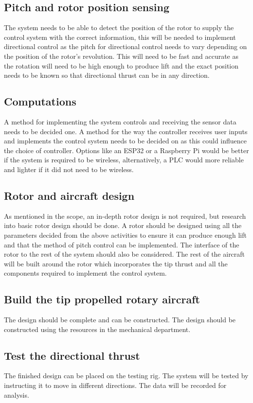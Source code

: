     \subsection{Pitch and rotor position sensing}
        The system needs to be able to detect the position of the rotor to supply the control system with the correct information, this will be needed to implement directional control as the pitch for directional control needs to vary depending on the position of the rotor's revolution. This will need to be fast and accurate as the rotation will need to be high enough to produce lift and the exact position needs to be known so that directional thrust can be in any direction. 
    \subsection{Computations}
        A method for implementing the system controls and receiving the sensor data needs to be decided one. A method for the way the controller receives user inputs and implements the control system needs to be decided on as this could influence the choice of controller. Options like an ESP32 or a Raspberry Pi would be better if the system is required to be wireless, alternatively, a PLC would more reliable and lighter if it did not need to be wireless.
    \subsection{Rotor and aircraft design}
        As mentioned in the scope, an in-depth rotor design is not required, but research into basic rotor design should be done. A rotor should be designed using all the parameters decided from the above activities to ensure it can produce enough lift and that the method of pitch control can be implemented. The interface of the rotor to the rest of the system should also be considered. The rest of the aircraft will be built around the rotor which incorporates the tip thrust and all the components required to implement the control system.
    \subsection{Build the tip propelled rotary aircraft}\label{sec:build}
        The design should be complete and can be constructed. The design should be constructed using the resources in the mechanical department. 
    \subsection{Test the directional thrust}
        The finished design can be placed on the testing rig. The system will be tested by instructing it to move in different directions. The data will be recorded for analysis. 

